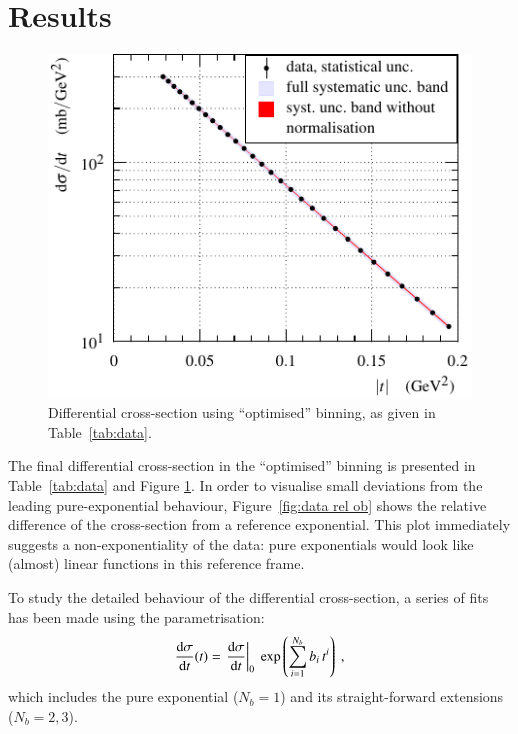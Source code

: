 \section{Results}


\begin{figure}
\begin{center}
\includegraphics{fig/t_dist.pdf}
\caption{%
Differential cross-section using ``optimised'' binning, as given in Table~\ref{tab:data}.
}
\label{fig:data ob}
\end{center}
\end{figure}


The final differential cross-section in the ``optimised'' binning is presented in Table~\ref{tab:data} and Figure \ref{fig:data ob}. In order to visualise small deviations from the leading pure-exponential behaviour, Figure~\ref{fig:data rel ob} shows the relative difference of the cross-section from a reference exponential. This plot immediately suggests a non-exponentiality of the data: pure exponentials would look like (almost) linear functions in this reference frame.

To study the detailed behaviour of the differential cross-section, a series of fits has been made using the parametrisation:
\begin{equation}
\label{eq:fit param}
{\d\sigma\over\d t}(t) = \left. \d\sigma\over\d t\right|_{0} \ \exp\left( \sum\limits_{i = 1}^{N_{b}} b_i\, t^i \right) \ ,
\end{equation}
which includes the pure exponential ($N_b = 1$) and its straight-forward extensions ($N_b = 2, 3$).

